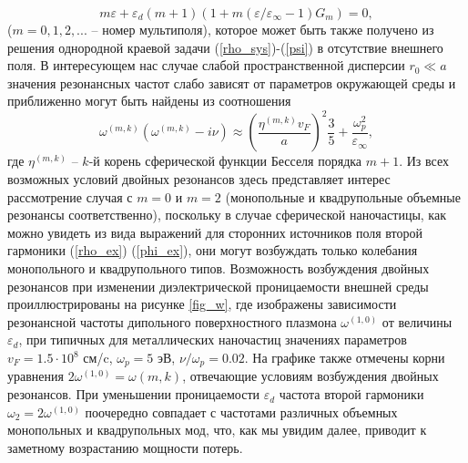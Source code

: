 \documentclass[12pt, a4paper]{article}
\def \eps {\varepsilon}
\def \w {\omega}
\begin{document}
\begin{equation}
	\label{freq_eq} 	
m \eps + \eps_d(m+1)(1 + m (\eps/\eps_\infty - 1) G_m) = 0,	
\end{equation}
($m=0,1,2,...$ – номер мультиполя), которое может быть также получено из решения однородной краевой задачи (\ref{rho_sys})-(\ref{psi}) в отсутствие внешнего поля. В интересующем нас случае слабой пространственной дисперсии $r_0 \ll a$ значения резонансных частот слабо зависят от параметров окружающей среды и приближенно могут быть найдены из соотношения 
\begin{equation} 
 \w^{(m,k)}(\w^{(m,k)} - i \nu) \approx \left(\frac{\eta^{(m,k)} v_F }{a}\right)^2 \frac{3}{5} + \frac{\w_p^2}{\eps_\infty},
\end{equation}
где $\eta^{(m,k)}$ -- $k$-й корень сферической функции Бесселя порядка $m+1$.	Из всех возможных условий двойных резонансов здесь представляет интерес рассмотрение случая с $m=0$ и $m=2$ (монопольные и квадрупольные объемные резонансы соответственно), поскольку в случае сферической наночастицы, как можно увидеть из вида выражений для сторонних источников поля второй гармоники (\ref{rho_ex}) (\ref{phi_ex}), они  могут возбуждать только колебания монопольного и квадрупольного типов.
Возможность возбуждения двойных резонансов при изменении диэлектрической проницаемости внешней среды проиллюстрированы на рисунке \ref{fig_w}, где изображены зависимости резонансной частоты дипольного поверхностного плазмона $\w^{(1,0)}$ от величины $\eps_d$, при типичных для металлических наночастиц значениях параметров $v_F = 1.5 \cdot 10^8$ см/c, $\w_p = 5$ эВ, $\nu / \w_p = 0.02$. 
На графике также отмечены корни уравнения $2\w^{(1,0)}=\w{(m,k)}$, отвечающие условиям возбуждения двойных резонансов.
При уменьшении проницаемости $\eps_d$ частота второй гармоники $\w_2=2\w^{(1,0)}$ поочередно совпадает с частотами различных объемных монопольных и квадрупольных мод, что, как мы увидим далее, приводит к заметному возрастанию мощности потерь. 
\end{document}
